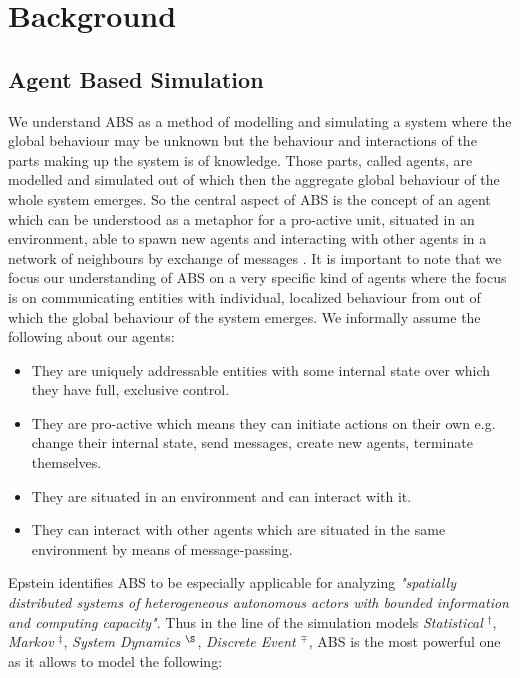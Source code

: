 \section{Background}

\subsection{Agent Based Simulation}
We understand ABS as a method of modelling and simulating a system where the global behaviour may be unknown but the behaviour and interactions of the parts making up the system is of knowledge. Those parts, called agents, are modelled and simulated out of which then the aggregate global behaviour of the whole system emerges. So the central aspect of ABS is the concept of an agent which can be understood as a metaphor for a pro-active unit, situated in an environment, able to spawn new agents and interacting with other agents in a network of neighbours by exchange of messages \cite{wooldridge_introduction_2009}. It is important to note that we focus our understanding of ABS on a very specific kind of agents where the focus is on communicating entities with individual, localized behaviour from out of which the global behaviour of the system emerges. We informally assume the following about our agents:

\begin{itemize}
	\item They are uniquely addressable entities with some internal state over which they have full, exclusive control.
	\item They are pro-active which means they can initiate actions on their own e.g. change their internal state, send messages, create new agents, terminate themselves.
	\item They are situated in an environment and can interact with it.
	\item They can interact with other agents which are situated in the same environment by means of message-passing.
\end{itemize} 

Epstein \cite{epstein_generative_2012} identifies ABS to be especially applicable for analyzing \textit{"spatially distributed systems of heterogeneous autonomous actors with bounded information and computing capacity"}. Thus in the line of the simulation models \textit{Statistical} $^\dag$, \textit{Markov} $^\ddag$, \textit{System Dynamics} $^\S$, \textit{Discrete Event} $^\mp$, ABS is the most powerful one as it allows to model  the following:

